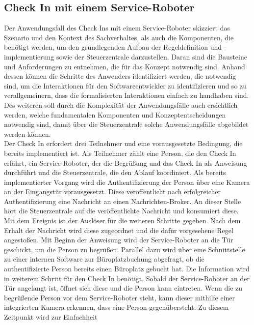 \subsection{Check In mit einem Service-Roboter}
    Der Anwendungsfall des Check Ins mit einem Service-Roboter skizziert das Szenario und den Kontext des Sachverhaltes, als 
    auch die Komponenten, die benötigt werden, um den grundlegenden Aufbau der Regeldefinition und -implementierung sowie 
    der Steuerzentrale darzustellen. Daran sind die Bausteine und Anforderungen zu entnehmen, die für das Konzept notwendig 
    sind. Anhand dessen können die Schritte des Anwenders identifiziert werden, die notwendig sind, um die Interaktionen für den 
    Softwareentwickler zu identifizieren und so zu verallgemeinern, dass die formalisierten Interaktionen einfach zu 
    handhaben sind. Des weiteren soll durch die Komplexität der Anwendungsfälle auch ersichtlich werden, welche fundamentalen 
    Komponenten und Konzeptentscheidungen notwendig sind, damit über die Steuerzentrale solche Anwendungsfälle abgebildet werden 
    können.
    \\
    \linebreak
    Der Check In erfordert drei Teilnehmer und eine vorausgesetzte Bedingung, die bereits implementiert ist. Als Teilnehmer 
    zählt eine Person, die den Check In erfährt, ein Service-Roboter, der die Begrüßung und das Check In als Anweisung 
    durchführt und die Steuerzentrale, die den Ablauf koordiniert. Als bereits implementierter Vorgang wird die 
    Authentifizierung der Person über eine Kamera an der Eingangstür vorausgesetzt. Diese veröffentlicht nach erfolgreicher 
    Authentifizierung eine Nachricht an einen Nachrichten-Broker. An dieser Stelle hört die Steuerzentrale auf die 
    veröffentlichte Nachricht und konsumiert diese. Mit dem Ereignis ist der Auslöser für die weiteren Schritte gegeben. Nach 
    dem Erhalt der Nachricht wird diese zugeordnet und die dafür vorgesehene Regel angestoßen. Mit Beginn der Anweisung wird 
    der Service-Roboter an die Tür geschickt, um die Person zu begrüßen. Parallel dazu wird über eine Schnittstelle zu einer 
    internen Software zur Büroplatzbuchung abgefragt, ob die authentifizierte Person bereits einen Büroplatz gebucht hat. 
    Die Information wird in weiterem Schritt für den Check In benötigt. Sobald der Service-Roboter an der Tür angelangt ist, 
    öffnet sich diese und die Person kann eintreten. Wenn die zu begrüßende Person vor dem Service-Roboter steht, kann dieser 
    mithilfe einer integrierten Kamera erkennen, dass eine Person gegenübersteht. Zu diesem Zeitpunkt wird zur Einfachheit 
